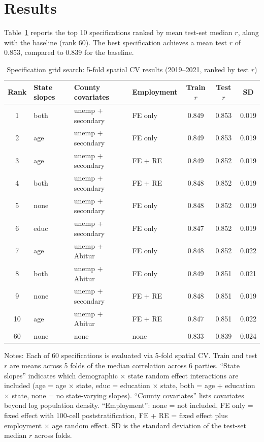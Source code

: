 \documentclass[11pt]{article}
\begin{document}
\section{Results}

Table~\ref{tab:grid} reports the top 10 specifications ranked by mean test-set median $r$, along with the baseline (rank 60). The best specification achieves a mean test $r$ of 0.853, compared to 0.839 for the baseline.

\begin{table}[h]
\centering
\caption{Specification grid search: 5-fold spatial CV results (2019--2021, ranked by test $r$)}
\label{tab:grid}
\begin{tabular}{@{}clllccc@{}}
\toprule
Rank & State slopes & County covariates & Employment & Train $r$ & Test $r$ & SD \\
\midrule
1  & both & unemp + secondary & FE only   & 0.849 & 0.853 & 0.019 \\
2  & age  & unemp + secondary & FE only   & 0.849 & 0.853 & 0.019 \\
3  & age  & unemp + secondary & FE + RE   & 0.849 & 0.852 & 0.019 \\
4  & both & unemp + secondary & FE + RE   & 0.848 & 0.852 & 0.019 \\
5  & none & unemp + secondary & FE only   & 0.848 & 0.852 & 0.019 \\
6  & educ & unemp + secondary & FE only   & 0.847 & 0.852 & 0.019 \\
7  & age  & unemp + Abitur    & FE only   & 0.848 & 0.852 & 0.022 \\
8  & both & unemp + Abitur    & FE only   & 0.849 & 0.851 & 0.021 \\
9  & none & unemp + secondary & FE + RE   & 0.848 & 0.851 & 0.019 \\
10 & age  & unemp + Abitur    & FE + RE   & 0.847 & 0.851 & 0.022 \\
\midrule
60 & none & none              & none      & 0.833 & 0.839 & 0.024 \\
\bottomrule
\end{tabular}

\vspace{0.5em}
\footnotesize
Notes: Each of 60 specifications is evaluated via 5-fold spatial CV. Train and test $r$ are means across 5 folds of the median correlation across 6 parties. ``State slopes'' indicates which demographic $\times$ state random effect interactions are included (age = age $\times$ state, educ = education $\times$ state, both = age + education $\times$ state, none = no state-varying slopes). ``County covariates'' lists covariates beyond log population density. ``Employment'': none = not included, FE only = fixed effect with 100-cell poststratification, FE + RE = fixed effect plus employment $\times$ age random effect. SD is the standard deviation of the test-set median $r$ across folds.
\end{table}
\end{document}
